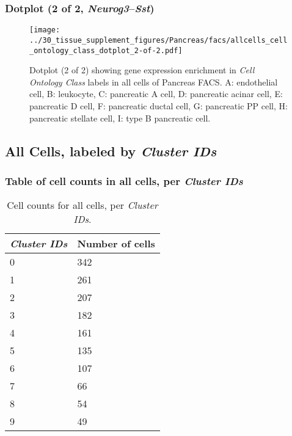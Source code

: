 \clearpage

\subsubsection{Dotplot (2 of 2, \emph{Neurog3}--\emph{Sst})}
\begin{figure}[h]
\centering
\texttt{[image: ../30\_tissue\_supplement\_figures/Pancreas/facs/allcells\_cell\_ontology\_class\_dotplot\_2-of-2.pdf]}

\caption{ Dotplot (2 of 2)  showing gene expression enrichment in \emph{Cell Ontology Class} labels in all cells of Pancreas FACS. A: endothelial cell, B: leukocyte, C: pancreatic A cell, D: pancreatic acinar cell, E: pancreatic D cell, F: pancreatic ductal cell, G: pancreatic PP cell, H: pancreatic stellate cell, I: type B pancreatic cell.}
\end{figure}


\clearpage

\subsection{All Cells, labeled by \emph{Cluster IDs}}
\subsubsection{Table of cell counts in all cells, per \emph{Cluster IDs}}\begin{table}[h]
\centering
\label{my-label}
\begin{tabular}{@{}ll@{}}
\toprule

\emph{Cluster IDs}& Number of cells \\ \midrule
0 & 342 \\

1 & 261 \\

2 & 207 \\

3 & 182 \\

4 & 161 \\

5 & 135 \\

6 & 107 \\

7 & 66 \\

8 & 54 \\

9 & 49 \\
\bottomrule
\end{tabular}
\caption{Cell counts for all cells, per \emph{Cluster IDs}.}
\end{table}

